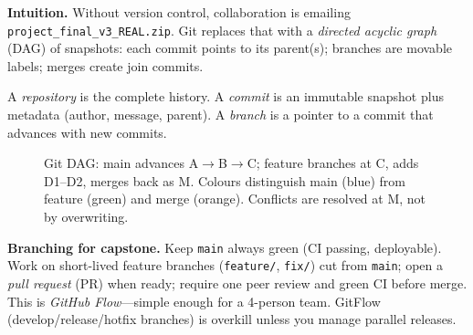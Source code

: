 \textbf{Intuition.} Without version control, collaboration is emailing \texttt{project\_final\_v3\_REAL.zip}. Git replaces that with a \emph{directed acyclic graph} (DAG) of snapshots: each commit points to its parent(s); branches are movable labels; merges create join commits.

\begin{definition}
A \emph{repository} is the complete history. A \emph{commit} is an immutable snapshot plus metadata (author, message, parent). A \emph{branch} is a pointer to a commit that advances with new commits.
\end{definition}

\begin{figure}[h]
\centering
{}
\caption{Git DAG: main advances A$\to$B$\to$C; feature branches at C, adds D1--D2, merges back as M. Colours distinguish main (blue) from feature (green) and merge (orange). Conflicts are resolved at M, not by overwriting.}
\label{fig:git-dag}
\end{figure}

\textbf{Branching for capstone.} Keep \texttt{main} always green (CI passing, deployable). Work on short-lived feature branches (\texttt{feature/}, \texttt{fix/}) cut from \texttt{main}; open a \emph{pull request} (PR) when ready; require one peer review and green CI before merge. This is \emph{GitHub Flow}---simple enough for a 4-person team. GitFlow (develop/release/hotfix branches) is overkill unless you manage parallel releases.


